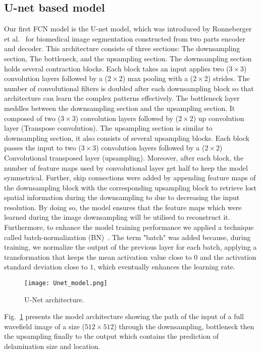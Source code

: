 \documentclass[preprint,10pt]{elsarticle}
\begin{document}
\subsection{U-net based model}
Our first FCN model is the U-net model, which was introduced by Ronneberger et al.~\cite{Ronneberger2015} for biomedical image segmentation constructed from two parts encoder and decoder. 
This architecture consists of three sections: The downsampling section, The bottleneck, and the upsampling section. 
The downsampling section holds several contraction blocks. 
Each block takes an input applies two (\(3\times3\)) convolution layers followed by a (\(2\times2\)) max pooling with a (\(2\times2\)) strides. 
The number of convolutional filters is doubled after each downsampling block so that architecture can learn the complex patterns effectively. 
The bottleneck layer meddles between the downsampling section and the upsampling section. 
It composed of two (\(3\times3\)) convolution layers followed by (\(2\times2\)) up convolution layer (Transpose convolution).
The upsampling section is similar to downsampling section, it also consists of several upsampling blocks. 
Each block passes the input to two (\(3\times3\)) convolution layers followed by a (\(2\times2\)) Convolutional transposed layer (upsampling). 
Moreover, after each block, the number of feature maps used by convolutional layer get half to keep the model symmetrical. 
Further, skip connections were added by appending feature maps of the downsampling block with the corresponding upsampling block to retrieve lost spatial information during the downsampling to due to decreasing the input resolution.
By doing so, the model ensures that the feature maps which were learned during the image downsampling will be utilised to reconstruct it. 
Furthermore, to enhance the model training performance we applied a technique called batch-normalization (BN)~\cite{Ioffe2015}.
The term "batch" was added because, during training, we normalize the output of the previous layer for each batch, applying a transformation that keeps the mean activation value close to \(0\) and the activation standard deviation close to \(1\), which eventually enhances the learning rate.
\begin{figure} [h!]
	\begin{center}
		\texttt{[image: Unet\_model.png]}
	\end{center}
	\caption{U-Net architecture.} 
	\label{fig:Unet}
\end{figure}
Fig.~\ref{fig:Unet} presents the model architecture showing the path of the input of a full wavefield image of a size (\(512\times512\)) through the downsampling, bottleneck then the upsampling finally to the output which contains the prediction of delamination size and location. 
\end{document}
